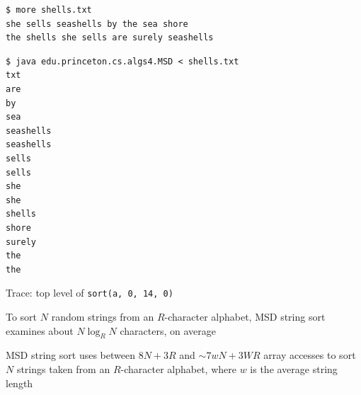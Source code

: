 \documentclass[8pt,a4paper,compress]{beamer}
\begin{document}
\begin{frame}[fragile]
\pause

\begin{lstlisting}[language={}]
$ more shells.txt 
she sells seashells by the sea shore
the shells she sells are surely seashells
\end{lstlisting}

\pause

\begin{lstlisting}[language={}]
$ java edu.princeton.cs.algs4.MSD < shells.txt 
txt 
are
by
sea
seashells
seashells
sells
sells
she
she
shells
shore
surely
the
the
\end{lstlisting}
\end{frame}

\begin{frame}[fragile]
\pause

Trace: top level of \lstinline{sort(a, 0, 14, 0)}

\begin{center}
\end{center}

To sort $N$ random strings from an $R$-character alphabet, MSD string sort examines about $N \log_R N$ characters, on average

\pause
\bigskip

MSD string sort uses between $8N + 3R$ and $\sim 7wN + 3WR$ array accesses
to sort $N$ strings taken from an $R$-character alphabet, where $w$ is the average string length
\end{frame}
\end{document}
